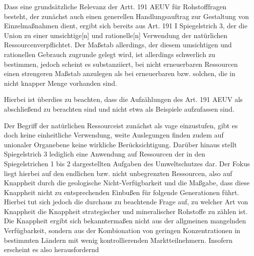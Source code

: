 \documentclass[12pt,a4paper,oneside]{book} %
\begin{document}
Dass eine grundsätzliche Relevanz der Artt. 191 AEUV für Rohstofffragen besteht, der zunächst auch einen generellen Handlungsauftrag zur Gestaltung von Einzelmaßnahmen dient,\autocite{Grabitz Hilf Nettesheim, Art. 191 Rn. 58} ergibt sich bereits aus Art. 191 I Spiegelstrich 3, der die Union zu einer \glqq umsichtige[n] und rationelle[n] Verwendung der natürlichen Ressourcen\glqq verpflichtet. Der Maßstab allerdings, der diesem umsichtigen und rationellen Gebrauch zugrunde gelegt wird, ist allerdings schwerlich zu bestimmen, jedoch scheint es substanziiert, bei nicht erneuerbaren Ressourcen einen strengeren Maßstab anzulegen als bei erneuerbaren bzw. solchen, die in nicht knapper Menge vorhanden sind.\autocite{Callies/ruffert EUv AEUV, Art. 191 AEUv Rn. 12}
	
Hierbei ist überdies zu beachten, dass die Aufzählungen des Art. 191 AEUV als abschließend zu berachten sind und nicht etwa als Beispiele aufzufassen sind.\autocite{Grabitz Hilf Nettesheim, Art. 191 Rn. 62} 
	
Der Begriff der \glqq natürlichen Ressource\grqq ist zunächst als vage einzustufen, gibt es doch keine einheitliche Verwendung, weite Auslegungen finden zudem auf unionaler Organebene keine wirkliche Berücksichtigung. \autocite{von der Groeben/Schwarze/Hatje, AEUV Art. 191. Rn. 28} Darüber hinaus stellt Spiegelstrich 3 lediglich eine Anwendung auf Ressourcen der in den Spiegelstrichen 1 bis 2 dargestellten Aufgaben des Umweltschutzes dar.\autocite{Grabitz Hilf Nettesheim, Art. 191 Rn. 75} Der Fokus liegt hierbei auf den endlichen bzw. nicht unbegrenzten Ressourcen, also auf Knappheit durch die geologische Nicht-Verfügbarkeit und die Maßgabe, dass diese Knappheit nicht zu entsprechenden Einbußen für folgende Generationen führt.\autocite{Grabitz Hilf Nettesheim, Art. 191 Rn. 76} Hierbei tut sich jedoch die durchaus zu beachtende Frage auf, zu welcher Art von Knappheit die Knappheit strategischer und mineralischer Rohstoffe zu zählen ist. Die Knappheit ergibt sich bekanntermaßen nicht aus der allgmeinen mangelnden Verfügbarkeit, sondern aus der Kombionation von geringen Konzentrationen in bestimmten Ländern mit wenig kontrollierenden Marktteilnehmern. Insofern erscheint es also herausfordernd
\end{document}
